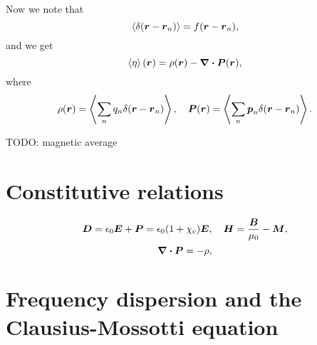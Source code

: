 \documentclass[hyperref, a4paper]{article}
\begin{document}
Now we note that 
\[
    \expval{ \delta(\vb*{r} - \vb*{r}_n)} = f(\vb*{r} - \vb*{r}_n), 
\]
and we get 
\begin{equation}
    \expval{\eta}(\vb*{r}) = \rho(\vb*{r}) - \div{\vb*{P}(\vb*{r})},
\end{equation}
where 
\begin{equation}
    \rho(\vb*{r}) = \expval{\sum_n q_n \delta(\vb*{r} - \vb*{r}_n)}, \quad 
    \vb*{P}(\vb*{r}) = \expval{\sum_n \vb*{p}_n \delta(\vb*{r} - \vb*{r}_n)}   .
\end{equation}

TODO: magnetic average

\section{Constitutive relations}

\begin{equation}
    \vb*{D} = \epsilon_0 \vb*{E} + \vb*{P} = \epsilon_0 (1 + \chi_\text{e}) \vb*{E}, \quad 
    \vb*{H} = \frac{\vb*{B}}{\mu_0} - \vb*{M},
\end{equation}
\begin{equation}
    \div{\vb*{P}} = - \rho,
\end{equation}


\section{Frequency dispersion and the Clausius-Mossotti equation}
\end{document}
